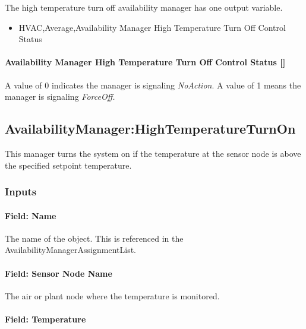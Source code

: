 The high temperature turn off availability manager has one output variable.

\begin{itemize}
\tightlist
\item
  HVAC,Average,Availability Manager High Temperature Turn Off Control Status
\end{itemize}

\paragraph{Availability Manager High Temperature Turn Off Control Status {[]}}\label{availability-manager-high-temperature-turn-off-control-status}

A value of 0 indicates the manager is signaling \emph{NoAction}. A value of 1 means the manager is signaling \emph{ForceOff.}

\subsection{AvailabilityManager:HighTemperatureTurnOn}\label{availabilitymanagerhightemperatureturnon}

This manager turns the system on if the temperature at the sensor node is above the specified setpoint temperature.

\subsubsection{Inputs}\label{inputs-6-028}

\paragraph{Field: Name}\label{field-name-5-025}

The name of the object. This is referenced in the AvailabilityManagerAssignmentList.

\paragraph{Field: Sensor Node Name}\label{field-sensor-node-name-1-000}

The air or plant node where the temperature is monitored.

\paragraph{Field: Temperature}\label{field-temperature-1}

